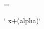 
\begingroup
{}=\active
\gdef\defParenCmds{%
    \def\lparen{\char40}%
    \catcode40=\active%
    \let(=\startParenWrap
}
\endgroup



\newtoks\parenContents
\newcount\parenLevel

\def\startParenWrap#1){[[#1]]}








` x+(alpha)`



\bye
